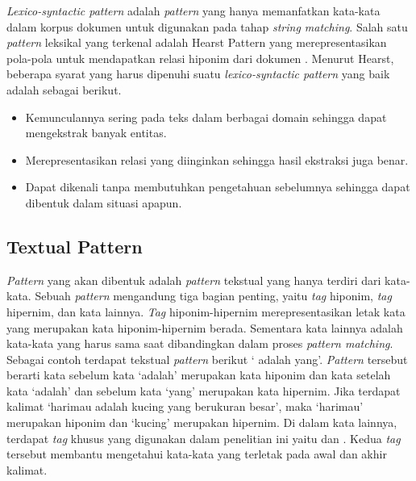 \textit{Lexico-syntactic pattern} adalah \textit{pattern} yang hanya memanfatkan kata-kata dalam korpus dokumen untuk digunakan pada tahap \textit{string matching}. Salah satu \textit{pattern} leksikal yang terkenal adalah Hearst Pattern yang merepresentasikan pola-pola untuk mendapatkan relasi hiponim dari dokumen \citep{hearst1992automatic}. Menurut Hearst, beberapa syarat yang harus dipenuhi suatu \textit{lexico-syntactic pattern} yang baik adalah sebagai berikut.
\begin{itemize}
  \item Kemunculannya sering pada teks dalam berbagai domain sehingga dapat mengekstrak banyak entitas.
  \item Merepresentasikan relasi yang diinginkan sehingga hasil ekstraksi juga benar.
  \item Dapat dikenali tanpa membutuhkan pengetahuan sebelumnya sehingga dapat dibentuk dalam situasi apapun.
\end{itemize}

\subsection{Textual Pattern}
\textit{Pattern} yang akan dibentuk adalah \textit{pattern} tekstual yang hanya terdiri dari kata-kata. Sebuah \textit{pattern} mengandung tiga bagian penting, yaitu \textit{tag} hiponim, \textit{tag} hipernim, dan kata lainnya. \textit{Tag} hiponim-hipernim merepresentasikan letak kata yang merupakan kata hiponim-hipernim berada. Sementara kata lainnya adalah kata-kata yang harus sama saat dibandingkan dalam proses \textit{pattern matching}. Sebagai contoh terdapat tekstual \textit{pattern} berikut `{\tagHyponym} adalah {\tagHypernym} yang'. \textit{Pattern} tersebut berarti kata sebelum kata `adalah' merupakan kata hiponim dan kata setelah kata `adalah' dan sebelum kata `yang' merupakan kata hipernim. Jika terdapat kalimat `harimau adalah kucing yang berukuran besar', maka `harimau' merupakan hiponim dan `kucing' merupakan hipernim. Di dalam kata lainnya, terdapat \textit{tag} khusus yang digunakan dalam penelitian ini yaitu {\tagStart} dan {\tagEnd}. Kedua \textit{tag} tersebut membantu mengetahui kata-kata yang terletak pada awal dan akhir kalimat.

